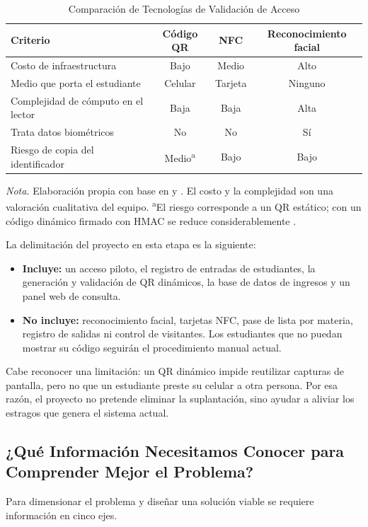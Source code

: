 \documentclass[stu,11pt,floatsintext,biblatex]{apa7}
\renewcommand{\figurenote}[1]{\par\noindent\textit{\notelabel.} #1\par}
\renewcommand{\tablenote}[1]{\par\smallskip\figurenote{#1}}
\renewcommand{\notelabel}{Nota}%
\begin{document}
\begin{table}[tbp]
  \caption{Comparación de Tecnologías de Validación de Acceso}
  \label{tab:comparativa}
  \begin{tabular}{lccc}
    \toprule
    Criterio & Código QR & NFC & Reconocimiento facial \\
    \midrule
    Costo de infraestructura & Bajo & Medio & Alto \\
    Medio que porta el estudiante & Celular & Tarjeta & Ninguno \\
    Complejidad de cómputo en el lector & Baja & Baja & Alta \\
    Trata datos biométricos & No & No & Sí \\
    Riesgo de copia del identificador & Medio\textsuperscript{a} & Bajo & Bajo \\
    \bottomrule
  \end{tabular}
  \tablenote{Elaboración propia con base en
  \textcite{harnaningrum2024comparison} y \textcite{rukhiran2023user}. El costo
  y la complejidad son una valoración cualitativa del equipo.
  \textsuperscript{a}El riesgo corresponde a un QR estático; con un código
  dinámico firmado con HMAC se reduce considerablemente
  \parencite{subpratatsavee2015hmac}.}
\end{table}

La delimitación del proyecto en esta etapa es la siguiente:
\begin{itemize}
  \item \textbf{Incluye:} un acceso piloto, el registro de entradas de
  estudiantes, la generación y validación de QR dinámicos, la base de datos de
  ingresos y un panel web de consulta.
  \item \textbf{No incluye:} reconocimiento facial, tarjetas NFC, pase de lista
  por materia, registro de salidas ni control de visitantes. Los estudiantes
  que no puedan mostrar su código seguirán el procedimiento manual actual.
\end{itemize}

Cabe reconocer una limitación: un QR dinámico impide reutilizar capturas de
pantalla, pero no que un estudiante preste su celular a otra persona. Por esa
razón, el proyecto no pretende eliminar la suplantación, sino ayudar a aliviar
los estragos que genera el sistema actual.

\subsection{¿Qué Información Necesitamos Conocer para Comprender Mejor el Problema?}
Para dimensionar el problema y diseñar una solución viable se requiere
información en cinco ejes.
\end{document}
